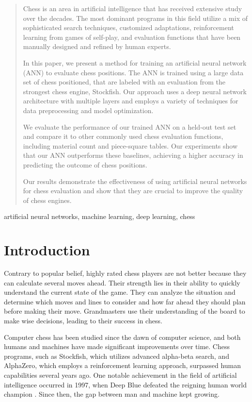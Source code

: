 \documentclass[conference]{IEEEtran}
\begin{document}
\begin{abstract}
Chess is an area in artificial intelligence that has received extensive study over the decades. The most dominant programs in this field utilize a mix of sophisticated search techniques, customized adaptations, reinforcement learning from games of self-play, and evaluation functions that have been manually designed and refined by human experts.

In this paper, we present a method for training an artificial neural network (ANN) to evaluate chess positions. The ANN is trained using a large data set of chess positioned, that are labeled with an evaluation from the strongest chess engine, Stockfish. Our approach uses a deep neural network architecture with multiple layers and employs a variety of techniques for data preprocessing and model optimization.

We evaluate the performance of our trained ANN on a held-out test set and compare it to other commonly used chess evaluation functions, including material count and piece-square tables. Our experiments show that our ANN outperforms these baselines, achieving a higher accuracy in predicting the outcome of chess positions.

Our results demonstrate the effectiveness of using artificial neural networks for chess evaluation and show that they are crucial to improve the quality of chess engines.
\end{abstract}
\begin{IEEEkeywords}
artificial neural networks, machine learning, deep learning, chess
\end{IEEEkeywords}

\section{Introduction}\label{introduction}
Contrary to popular belief, highly rated chess players are not better because they can calculate several moves ahead. Their strength lies in their ability to quickly understand the current state of the game. They can analyze the situation and determine which moves and lines to consider and how far ahead they should plan before making their move. Grandmasters use their understanding of the board to make wise decisions, leading to their success in chess.

Computer chess has been studied since the dawn of computer science, and both humans and machines have made significant improvements over time. Chess programs, such as Stockfish, which utilizes advanced alpha-beta search, and AlphaZero, which employs a reinforcement learning approach, surpassed human capabilities several years ago. One notable achievement in the field of artificial intelligence occurred in 1997, when Deep Blue defeated the reigning human world champion \cite{b1}. Since then, the gap between man and machine kept growing. 
\end{document}
